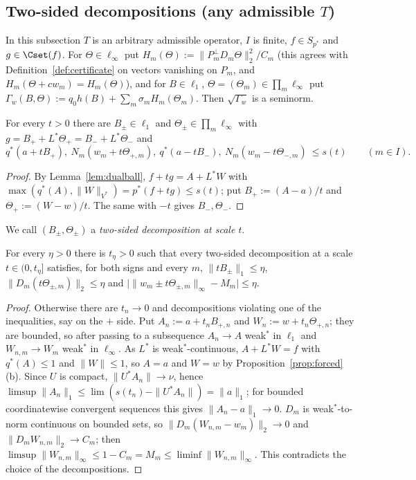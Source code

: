 
\subsection{Two-sided decompositions (any admissible $T$)}
In this subsection $T$ is an arbitrary admissible operator, $I$ is finite,
$f\in S_{p^*}$ and $g\in\Cset(f)$.  For $\Theta\in\ell_\infty$ put
$H_m(\Theta):=\|P_m^\perp D_m\Theta\|_2^2/C_m$ (this agrees with
Definition~\ref{def:certificate} on vectors vanishing on $P_m$, and
$H_m(\Theta+cw_m)=H_m(\Theta)$), and for $B\in\ell_1$,
$\Theta=(\Theta_m)\in\prod_m\ell_\infty$ put $\Gamma_w(B,\Theta):=q_0h(B)+
\sum_m\sigma_mH_m(\Theta_m)$.  Then $\sqrt{\Gamma_w}$ is a seminorm.

\begin{lemma}\label{lem:twosided}
For every $t>0$ there are $B_\pm\in\ell_1$ and $\Theta_\pm\in\prod_m
\ell_\infty$ with $g=B_++L^*\Theta_+=B_-+L^*\Theta_-$ and
\[
 q^*(a+tB_+),\ N_m(w_m+t\Theta_{+,m}),\ q^*(a-tB_-),\ N_m(w_m-t\Theta_{-,m})
 \ \le s(t)\qquad(m\in I).
\]
\end{lemma}

\begin{proof}
By Lemma~\ref{lem:dualball}, $f+tg=A+L^*W$ with $\max(q^*(A),\|W\|_{V^*})=
p^*(f+tg)\le s(t)$; put $B_+:=(A-a)/t$ and $\Theta_+:=(W-w)/t$.  The same
with $-t$ gives $B_-,\Theta_-$.
\end{proof}

We call $(B_\pm,\Theta_\pm)$ a \emph{two-sided decomposition at scale $t$}.

\begin{lemma}\label{lem:smallness}
For every $\eta>0$ there is $t_\eta>0$ such that every two-sided
decomposition at a scale $t\in(0,t_\eta]$ satisfies, for both signs and
every $m$, $\|tB_\pm\|_1\le\eta$, $\|D_m(t\Theta_{\pm,m})\|_2\le\eta$ and
$\big|\|w_m\pm t\Theta_{\pm,m}\|_\infty-M_m\big|\le\eta$.
\end{lemma}

\begin{proof}
Otherwise there are $t_n\to0$ and decompositions violating one of the
inequalities, say on the $+$ side.  Put $A_n:=a+t_nB_{+,n}$ and
$W_n:=w+t_n\Theta_{+,n}$; they are bounded, so after passing to a
subsequence $A_n\to A$ weak$^*$ in $\ell_1$ and $W_{n,m}\to W_m$ weak$^*$ in
$\ell_\infty$.  As $L^*$ is weak$^*$-continuous, $A+L^*W=f$ with
$q^*(A)\le1$ and $\|W\|\le1$, so $A=a$ and $W=w$ by
Proposition~\ref{prop:forced}(b).  Since $U$ is compact, $\|U^*A_n\|\to\nu$,
hence $\limsup\|A_n\|_1\le\lim(s(t_n)-\|U^*A_n\|)=\|a\|_1$; for bounded
coordinatewise convergent sequences this gives $\|A_n-a\|_1\to0$.  $D_m$ is
weak$^*$-to-norm continuous on bounded sets, so $\|D_m(W_{n,m}-w_m)\|_2\to0$
and $\|D_mW_{n,m}\|_2\to C_m$; then $\limsup\|W_{n,m}\|_\infty\le
1-C_m=M_m\le\liminf\|W_{n,m}\|_\infty$.  This contradicts the choice of the
decompositions.
\end{proof}

